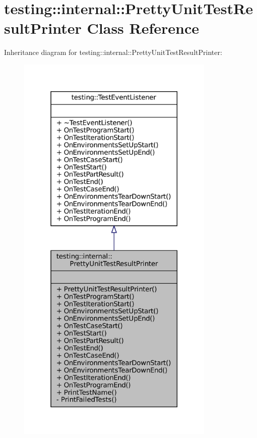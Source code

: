 \hypertarget{classtesting_1_1internal_1_1PrettyUnitTestResultPrinter}{}\section{testing\+:\+:internal\+:\+:Pretty\+Unit\+Test\+Result\+Printer Class Reference}
\label{classtesting_1_1internal_1_1PrettyUnitTestResultPrinter}


Inheritance diagram for testing\+:\+:internal\+:\+:Pretty\+Unit\+Test\+Result\+Printer\+:
\nopagebreak
\begin{figure}[H]
\begin{center}
\leavevmode
\includegraphics[height=550pt]{classtesting_1_1internal_1_1PrettyUnitTestResultPrinter__inherit__graph}
\end{center}
\end{figure}


